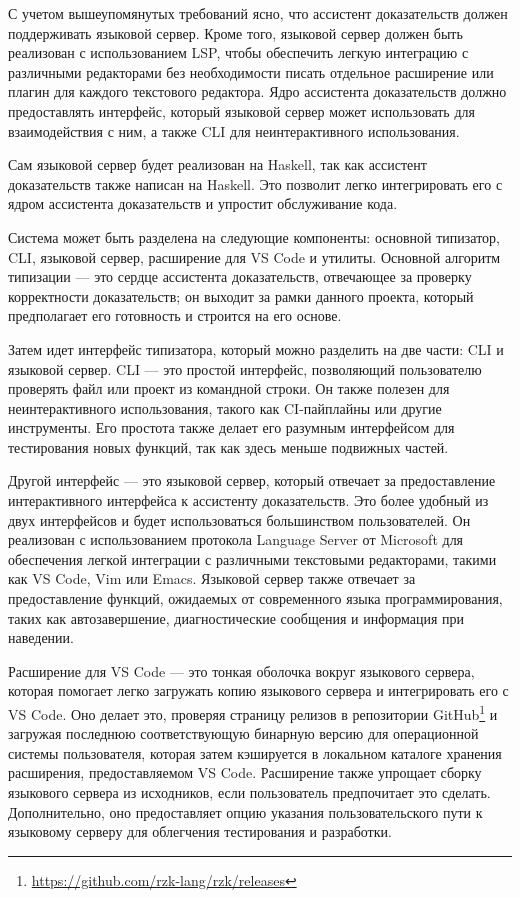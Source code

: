 С учетом вышеупомянутых требований ясно, что ассистент доказательств должен поддерживать языковой сервер. Кроме того, языковой сервер должен быть реализован с использованием LSP, чтобы обеспечить легкую интеграцию с различными редакторами без необходимости писать отдельное расширение или плагин для каждого текстового редактора. Ядро ассистента доказательств должно предоставлять интерфейс, который языковой сервер может использовать для взаимодействия с ним, а также CLI для неинтерактивного использования.

Сам языковой сервер будет реализован на Haskell, так как ассистент доказательств также написан на Haskell. Это позволит легко интегрировать его с ядром ассистента доказательств и упростит обслуживание кода.

Система может быть разделена на следующие компоненты: основной типизатор, CLI, языковой сервер, расширение для VS Code и утилиты. Основной алгоритм типизации — это сердце ассистента доказательств, отвечающее за проверку корректности доказательств; он выходит за рамки данного проекта, который предполагает его готовность и строится на его основе.

Затем идет интерфейс типизатора, который можно разделить на две части: CLI и языковой сервер. CLI — это простой интерфейс, позволяющий пользователю проверять файл или проект из командной строки. Он также полезен для неинтерактивного использования, такого как CI-пайплайны или другие инструменты. Его простота также делает его разумным интерфейсом для тестирования новых функций, так как здесь меньше подвижных частей.

Другой интерфейс — это языковой сервер, который отвечает за предоставление интерактивного интерфейса к ассистенту доказательств. Это более удобный из двух интерфейсов и будет использоваться большинством пользователей. Он реализован с использованием протокола Language Server от Microsoft для обеспечения легкой интеграции с различными текстовыми редакторами, такими как VS Code, Vim или Emacs. Языковой сервер также отвечает за предоставление функций, ожидаемых от современного языка программирования, таких как автозавершение, диагностические сообщения и информация при наведении.

Расширение для VS Code — это тонкая оболочка вокруг языкового сервера, которая помогает легко загружать копию языкового сервера и интегрировать его с VS Code. Оно делает это, проверяя страницу релизов в репозитории GitHub\footnote{\url{https://github.com/rzk-lang/rzk/releases}} и загружая последнюю соответствующую бинарную версию для операционной системы пользователя, которая затем кэшируется в локальном каталоге хранения расширения, предоставляемом VS Code. Расширение также упрощает сборку языкового сервера из исходников, если пользователь предпочитает это сделать. Дополнительно, оно предоставляет опцию указания пользовательского пути к языковому серверу для облегчения тестирования и разработки.


